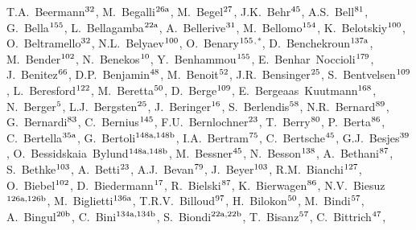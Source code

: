 \begin{flushleft}
T.A.~Beermann$^\textrm{\scriptsize 32}$,
M.~Begalli$^\textrm{\scriptsize 26a}$,
M.~Begel$^\textrm{\scriptsize 27}$,
J.K.~Behr$^\textrm{\scriptsize 45}$,
A.S.~Bell$^\textrm{\scriptsize 81}$,
G.~Bella$^\textrm{\scriptsize 155}$,
L.~Bellagamba$^\textrm{\scriptsize 22a}$,
A.~Bellerive$^\textrm{\scriptsize 31}$,
M.~Bellomo$^\textrm{\scriptsize 154}$,
K.~Belotskiy$^\textrm{\scriptsize 100}$,
O.~Beltramello$^\textrm{\scriptsize 32}$,
N.L.~Belyaev$^\textrm{\scriptsize 100}$,
O.~Benary$^\textrm{\scriptsize 155}$$^{,*}$,
D.~Benchekroun$^\textrm{\scriptsize 137a}$,
M.~Bender$^\textrm{\scriptsize 102}$,
N.~Benekos$^\textrm{\scriptsize 10}$,
Y.~Benhammou$^\textrm{\scriptsize 155}$,
E.~Benhar~Noccioli$^\textrm{\scriptsize 179}$,
J.~Benitez$^\textrm{\scriptsize 66}$,
D.P.~Benjamin$^\textrm{\scriptsize 48}$,
M.~Benoit$^\textrm{\scriptsize 52}$,
J.R.~Bensinger$^\textrm{\scriptsize 25}$,
S.~Bentvelsen$^\textrm{\scriptsize 109}$,
L.~Beresford$^\textrm{\scriptsize 122}$,
M.~Beretta$^\textrm{\scriptsize 50}$,
D.~Berge$^\textrm{\scriptsize 109}$,
E.~Bergeaas~Kuutmann$^\textrm{\scriptsize 168}$,
N.~Berger$^\textrm{\scriptsize 5}$,
L.J.~Bergsten$^\textrm{\scriptsize 25}$,
J.~Beringer$^\textrm{\scriptsize 16}$,
S.~Berlendis$^\textrm{\scriptsize 58}$,
N.R.~Bernard$^\textrm{\scriptsize 89}$,
G.~Bernardi$^\textrm{\scriptsize 83}$,
C.~Bernius$^\textrm{\scriptsize 145}$,
F.U.~Bernlochner$^\textrm{\scriptsize 23}$,
T.~Berry$^\textrm{\scriptsize 80}$,
P.~Berta$^\textrm{\scriptsize 86}$,
C.~Bertella$^\textrm{\scriptsize 35a}$,
G.~Bertoli$^\textrm{\scriptsize 148a,148b}$,
I.A.~Bertram$^\textrm{\scriptsize 75}$,
C.~Bertsche$^\textrm{\scriptsize 45}$,
G.J.~Besjes$^\textrm{\scriptsize 39}$,
O.~Bessidskaia~Bylund$^\textrm{\scriptsize 148a,148b}$,
M.~Bessner$^\textrm{\scriptsize 45}$,
N.~Besson$^\textrm{\scriptsize 138}$,
A.~Bethani$^\textrm{\scriptsize 87}$,
S.~Bethke$^\textrm{\scriptsize 103}$,
A.~Betti$^\textrm{\scriptsize 23}$,
A.J.~Bevan$^\textrm{\scriptsize 79}$,
J.~Beyer$^\textrm{\scriptsize 103}$,
R.M.~Bianchi$^\textrm{\scriptsize 127}$,
O.~Biebel$^\textrm{\scriptsize 102}$,
D.~Biedermann$^\textrm{\scriptsize 17}$,
R.~Bielski$^\textrm{\scriptsize 87}$,
K.~Bierwagen$^\textrm{\scriptsize 86}$,
N.V.~Biesuz$^\textrm{\scriptsize 126a,126b}$,
M.~Biglietti$^\textrm{\scriptsize 136a}$,
T.R.V.~Billoud$^\textrm{\scriptsize 97}$,
H.~Bilokon$^\textrm{\scriptsize 50}$,
M.~Bindi$^\textrm{\scriptsize 57}$,
A.~Bingul$^\textrm{\scriptsize 20b}$,
C.~Bini$^\textrm{\scriptsize 134a,134b}$,
S.~Biondi$^\textrm{\scriptsize 22a,22b}$,
T.~Bisanz$^\textrm{\scriptsize 57}$,
C.~Bittrich$^\textrm{\scriptsize 47}$,
$$
\end{flushleft}
